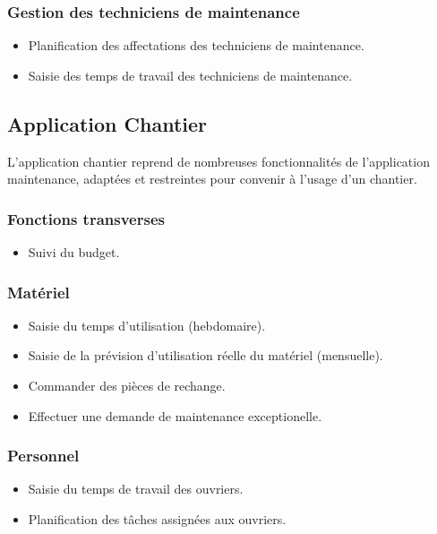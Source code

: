 \subsubsection{Gestion des techniciens de maintenance}
\begin{itemize}
\item Planification des affectations des techniciens de maintenance.
\item Saisie des temps de travail des techniciens de maintenance.
\end{itemize}


\subsection{Application Chantier}
L'application chantier reprend de nombreuses fonctionnalités de
l'application maintenance, adaptées et restreintes pour convenir à l'usage
d'un chantier.

\subsubsection{Fonctions transverses}
\begin{itemize}
\item Suivi du budget.
\end{itemize}

\subsubsection{Matériel}
\begin{itemize}
\item Saisie du temps d'utilisation (hebdomaire).
\item Saisie de la prévision d'utilisation réelle du matériel (mensuelle).
\item Commander des pièces de rechange.
\item Effectuer une demande de maintenance exceptionelle.
\end{itemize}

\subsubsection{Personnel}
\begin{itemize}
\item Saisie du temps de travail des ouvriers.
\item Planification des tâches assignées aux ouvriers.
\end{itemize}
